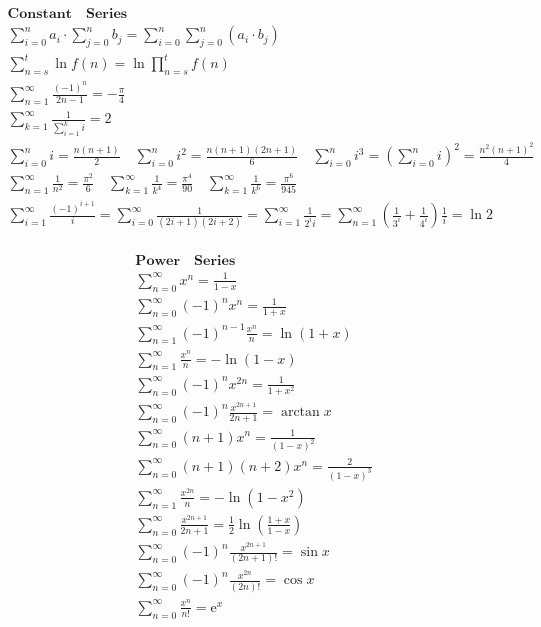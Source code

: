 \documentclass{article}
\begin{document}
\begin{align*}
    \bm{Constant \quad Series} \\  
    \sum_{i=0}^{n}{a_{i}} \cdot \sum_{j=0}^{n}{b_{j}} = \sum_{i=0}^{n}\sum_{j=0}^{n}{(a_{i} \cdot b_{j})} \\
    \sum_{n=s}^{t}\ln{f(n)} = \ln{\prod_{n=s}^{t}}f(n) \\ 
    \sum_{n=1}^{\infty}{\frac{(-1)^n}{2n-1}} = -\frac{\pi}{4} \\ 
    \sum_{k=1}^{\infty}{\frac{1}{\sum_{i=1}^k{i}}} = 2 \\ 
    \sum_{i=0}^{n}{i} = \frac{n(n+1)}{2} \quad \sum_{i=0}^{n}{i^2} = \frac{n(n+1)(2n+1)}{6} \quad \sum_{i=0}^{n}{i^3} = (\sum_{i=0}^{n}{i})^2 = \frac{n^2(n+1)^2}{4} \\ 
    \sum_{n=1}^{\infty}{\frac{1}{n^2}} = \frac{\pi^2}{6} \quad \sum_{k=1}^{\infty}{\frac{1}{k^4}} = \frac{\pi^4}{90} \quad \sum_{k=1}^{\infty}{\frac{1}{k^6}} = \frac{\pi^6}{945} \\ 
    \sum_{i=1}^{\infty}{\frac{(-1)^{i+1}}{i}} = \sum_{i=0}^{\infty}{\frac{1}{(2i+1)(2i+2)}} = \sum_{i=1}^{\infty}{\frac{1}{2^i i}} = \sum_{n=1}^{\infty}({\frac{1}{3^i}+\frac{1}{4^i}})\frac{1}{i}= \ln2 \\ 
\end{align*}

\clearpage

\begin{align*}
    \bm{Power \quad Series} \\ 
    \sum_{n=0}^{\infty}{x^n} = \frac{1}{1-x} \\ 
    \sum_{n=0}^{\infty}{(-1)^nx^n} = \frac{1}{1+x} \\ 
    \sum_{n=1}^{\infty}{(-1)^{n-1}\frac{x^n}{n}} = \ln(1+x) \\ 
    \sum_{n=1}^{\infty}{\frac{x^n}{n}} = -\ln(1-x) \\ 
    \sum_{n=0}^{\infty}{(-1)^nx^{2n}} = \frac{1}{1+x^2} \\ 
    \sum_{n=0}^{\infty}{(-1)^{n}\frac{x^{2n+1}}{2n+1}} = \arctan x \\ 
    \sum_{n=0}^{\infty}{(n+1)x^n} = \frac{1}{(1-x)^2} \\ 
    \sum_{n=0}^{\infty}{(n+1)(n+2)x^n} = \frac{2}{(1-x)^3} \\
    \sum_{n=1}^{\infty}{\frac{x^{2n}}{n}} = -\ln(1-x^2) \\ 
    \sum_{n=0}^{\infty}{\frac{x^{2n+1}}{2n+1}} = \frac{1}{2}\ln(\frac{1+x}{1-x})\\  
    \sum_{n=0}^{\infty}{(-1)^{n} \frac{x^{2n+1}}{(2n+1)!}} = \sin x \\  
    \sum_{n=0}^{\infty}{(-1)^{n} \frac{x^{2n}}{(2n)!}} = \cos x \\  
    \sum_{n=0}^{\infty}{\frac{x^{n}}{n!}} =  \mathrm{e}^x \\ 
\end{align*}
\end{document}
